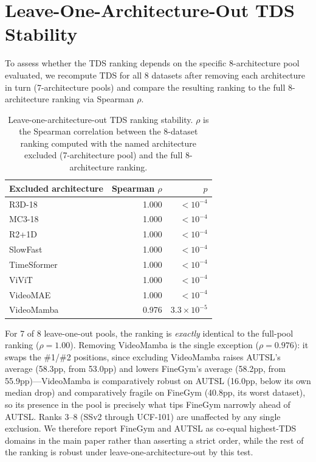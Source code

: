 \documentclass[runningheads]{llncs}
\newcommand{\tabtight}{\setlength{\tabcolsep}{3.5pt}\renewcommand{\arraystretch}{1.12}}
\newcommand{\TDS}{\textsc{TDS}}
\begin{document}
\section{Leave-One-Architecture-Out \texorpdfstring{\TDS{}}{TDS} Stability}
\label{sec:sup_loo}

To assess whether the \TDS{} ranking depends on the specific 8-architecture pool evaluated, we recompute \TDS{} for all 8 datasets after removing each architecture in turn (7-architecture pools) and compare the resulting ranking to the full 8-architecture ranking via Spearman $\rho$.

\begin{table}[!htbp]
\centering
\caption{Leave-one-architecture-out \TDS{} ranking stability. $\rho$ is the Spearman correlation between the 8-dataset ranking computed with the named architecture excluded (7-architecture pool) and the full 8-architecture ranking.}
\label{tab:loo_tds}
\scriptsize\tabtight
\begin{tabular}{l r r}
\toprule
Excluded architecture & Spearman $\rho$ & $p$ \\
\midrule
R3D-18       & 1.000 & $<10^{-4}$ \\
MC3-18       & 1.000 & $<10^{-4}$ \\
R2+1D        & 1.000 & $<10^{-4}$ \\
SlowFast     & 1.000 & $<10^{-4}$ \\
TimeSformer  & 1.000 & $<10^{-4}$ \\
ViViT        & 1.000 & $<10^{-4}$ \\
VideoMAE     & 1.000 & $<10^{-4}$ \\
VideoMamba   & 0.976 & $3.3\times10^{-5}$ \\
\bottomrule
\end{tabular}
\end{table}

For 7 of 8 leave-one-out pools, the ranking is \emph{exactly} identical to the full-pool ranking ($\rho=1.00$). Removing VideoMamba is the single exception ($\rho=0.976$): it swaps the \#1/\#2 positions, since excluding VideoMamba raises AUTSL's average (58.3pp, from 53.0pp) and lowers FineGym's average (58.2pp, from 55.9pp)---VideoMamba is comparatively robust on AUTSL (16.0pp, below its own median drop) and comparatively fragile on FineGym (40.8pp, its worst dataset), so its presence in the pool is precisely what tips FineGym narrowly ahead of AUTSL. Ranks 3--8 (SSv2 through UCF-101) are unaffected by any single exclusion. We therefore report FineGym and AUTSL as co-equal highest-\TDS{} domains in the main paper rather than asserting a strict order, while the rest of the ranking is robust under leave-one-architecture-out by this test.
\end{document}
